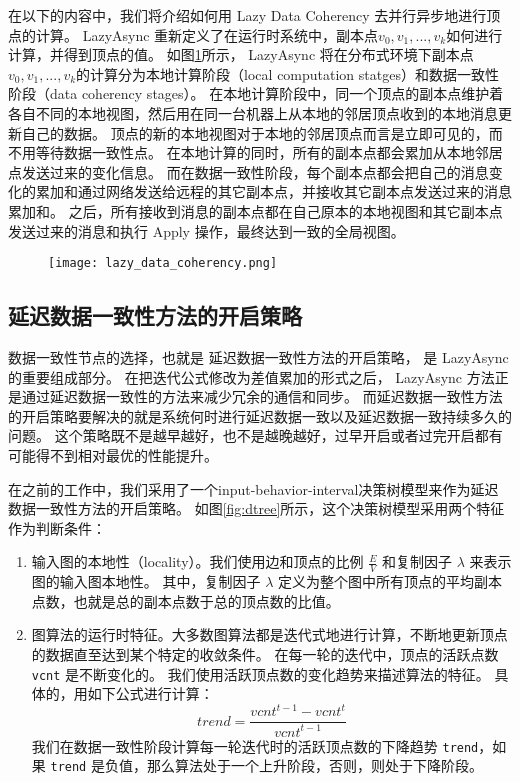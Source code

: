 在以下的内容中，我们将介绍如何用 Lazy Data Coherency 去并行异步地进行顶点的计算。
LazyAsync 重新定义了在运行时系统中，副本点$v_0 , v_1 , ... , v_k$如何进行计算，并得到顶点的值。
如图\ref{fig:lazy_data_coherency}所示，
LazyAsync 将在分布式环境下副本点$v_0 , v_1 , ... , v_k$的计算分为本地计算阶段（local computation statges）和数据一致性阶段（data coherency stages）。
在本地计算阶段中，同一个顶点的副本点维护着各自不同的本地视图，然后用在同一台机器上从本地的邻居顶点收到的本地消息更新自己的数据。
顶点的新的本地视图对于本地的邻居顶点而言是立即可见的，而不用等待数据一致性点。
在本地计算的同时，所有的副本点都会累加从本地邻居点发送过来的变化信息。
而在数据一致性阶段，每个副本点都会把自己的消息变化的累加和通过网络发送给远程的其它副本点，并接收其它副本点发送过来的消息累加和。
之后，所有接收到消息的副本点都在自己原本的本地视图和其它副本点发送过来的消息和执行 Apply 操作，最终达到一致的全局视图。
\begin{figure}[!htbp]
\centering
\texttt{[image: lazy\_data\_coherency.png]}
\label{fig:lazy_data_coherency}
\end{figure}

\subsection{延迟数据一致性方法的开启策略}

数据一致性节点的选择，也就是 延迟数据一致性方法的开启策略， 是 LazyAsync 的重要组成部分。
在把迭代公式修改为差值累加的形式之后， LazyAsync 方法正是通过延迟数据一致性的方法来减少冗余的通信和同步。
而延迟数据一致性方法的开启策略要解决的就是系统何时进行延迟数据一致以及延迟数据一致持续多久的问题。
这个策略既不是越早越好，也不是越晚越好，过早开启或者过完开启都有可能得不到相对最优的性能提升。


在之前的工作中，我们采用了一个input-behavior-interval决策树模型来作为延迟数据一致性方法的开启策略。
如图\ref{fig:dtree}所示，这个决策树模型采用两个特征作为判断条件：

\begin{enumerate}
  \item 输入图的本地性（locality）。我们使用边和顶点的比例 $\frac{E}{V}$ 和复制因子 $\lambda$ 来表示图的输入图本地性。
  其中，复制因子 $\lambda$ 定义为整个图中所有顶点的平均副本点数，也就是总的副本点数于总的顶点数的比值。
  \item 图算法的运行时特征。大多数图算法都是迭代式地进行计算，不断地更新顶点的数据直至达到某个特定的收敛条件。
  在每一轮的迭代中，顶点的活跃点数\verb|vcnt| 是不断变化的。
  我们使用活跃顶点数的变化趋势来描述算法的特征。
  具体的，用如下公式进行计算：
  \begin{equation}
  \label{equ:chap04:trend}
  trend = \frac{vcnt^{t-1}-vcnt^t}{vcnt^{t-1}}
  \end{equation}
  我们在数据一致性阶段计算每一轮迭代时的活跃顶点数的下降趋势 \verb|trend|，如果 \verb|trend| 是负值，那么算法处于一个上升阶段，否则，则处于下降阶段。
\end{enumerate}

